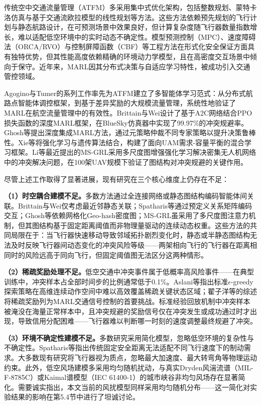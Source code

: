 \documentclass[12pt,a4paper,UTF8]{ctexart}
\begin{document}
传统空中交通流量管理（ATFM）多采用集中式优化架构，包括整数规划、蒙特卡洛仿真与基于交通流欧拉模型的线性规划等方法\cite{ref31}。这些方法依赖预先规划的飞行计划与静态航路设计，在可预测场景中效果良好，但计算复杂度随飞行器数量指数增长，难以适配低空环境中的实时动态不确定性。模型预测控制（MPC）\cite{ref27}、速度障碍法（ORCA/RVO）\cite{ref22}与控制屏障函数（CBF）\cite{ref23}等工程方法在形式化安全保证方面具有独特优势，但其性能高度依赖精确的环境动力学模型，且在高密度交互场景中倾向于保守。近年来，MARL因其分布式决策与自适应学习特性，被成功引入交通管控领域。

Agogino与Tumer的系列工作率先为ATFM建立了多智能体学习范式：从分布式航路点智能体调控框架\cite{ref1}，到基于差异奖励的大规模流量管理\cite{ref2}，系统性地验证了MARL在航空流量管理中的有效性。Brittain与Wei设计了基于A2C网络结合PPO损失函数的深度MARL框架，在BlueSky仿真器中实现了99.97\%的冲突规避率\cite{ref3}。Ghosh等提出深度集成MARL方法，通过元策略仲裁不同专家策略以提升决策鲁棒性\cite{ref9}。Xie等将强化学习与遗传算法结合，构建了面向UAM需求-容量平衡的混合学习框架\cite{ref6}。Li等最近提出的MS-GRL采用多尺度图增强强化学习解决密集无人机网络中的冲突解决问题，在100架UAV规模下验证了图结构对冲突规避的关键作用\cite{ref24}。

尽管上述工作取得了显著进展，现有研究在三个核心维度上仍存在不足：

\textbf{（1）时空耦合建模不足。}多数方法通过全连接网络或静态图结构编码智能体间关联。Brittain与Wei仅考虑最近邻静态关联\cite{ref3}；Spatharis等通过预定义关系矩阵编码交互\cite{ref7}；Ghosh等依赖网格化Geo-hash密度图\cite{ref9}；MS-GRL虽采用了多尺度图注意力机制，但其图结构基于固定距离阈值而非物理量驱动的连续动态权重\cite{ref24}。这些方法的共同局限在于：当飞行器快速移动导致邻域拓扑剧烈变化时，静态或半静态图结构无法及时反映飞行器间动态变化的冲突风险等级——两架相向飞行的飞行器在距离相同时的风险远高于同向飞行，但固定阈值图无法区分这两种情形。

\textbf{（2）稀疏奖励处理不足。}低空交通中冲突事件属于低概率高风险事件——在典型训练中，冲突样本占全部时间步的比例通常低于0.1\%。Aslani等指出标准$\epsilon$-greedy探索策略在高维连续动作空间中难以高效覆盖稀疏关键状态区域\cite{ref10}；翟子洋等的综述将稀疏奖励列为MARL交通信号控制的首要挑战\cite{ref11}。标准经验回放机制中冲突样本被淹没在海量正常样本中，且冲突规避的奖励信号仅在冲突发生或成功通过时才出现，导致信用分配困难——飞行器难以判断哪一时刻的速度调整最终规避了冲突。

\textbf{（3）环境不确定性建模不足。}多数研究采用简化模型，忽略低空环境的复杂性与不确定性。Spatharis等指出传统固定安全距离无法适配不同飞行速度下的制动需求\cite{ref7}。大多数现有研究将飞行器视为质点，忽略最大加速度、最大转弯角等物理运动约束。此外，低空风场建模多采用均匀随机扰动，与真实Dryden风湍流谱（MIL-F-8785C）\cite{ref20}或Kaimal谱模型（IEC 61400-1）的城市峡谷非均匀风场存在显著简化。需要诚实指出，本文当前的风扰模型同样采用均匀随机分布——这一简化对实验结果的影响在第5.4节中进行了坦诚讨论。
\end{document}
